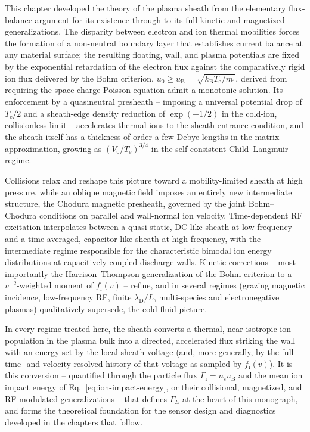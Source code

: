 This chapter developed the theory of the plasma sheath from the elementary flux-balance argument for its existence through to its full kinetic and magnetized generalizations. The disparity between electron and ion thermal mobilities forces the formation of a non-neutral boundary layer that establishes current balance at any material surface; the resulting floating, wall, and plasma potentials are fixed by the exponential retardation of the electron flux against the comparatively rigid ion flux delivered by the Bohm criterion, $u_{0} \ge u_{\mathrm{B}} = \sqrt{k_{\mathrm{B}} T_{\mathrm{e}}/m_{\mathrm{i}}}$, derived from requiring the space-charge Poisson equation admit a monotonic solution. Its enforcement by a quasineutral presheath -- imposing a universal potential drop of $T_{\mathrm{e}}/2$ and a sheath-edge density reduction of $\exp(-1/2)$ in the cold-ion, collisionless limit -- accelerates thermal ions to the sheath entrance condition, and the sheath itself has a thickness of order a few Debye lengths in the matrix approximation, growing as $(V_{0}/T_{\mathrm{e}})^{3/4}$ in the self-consistent Child--Langmuir regime.

Collisions relax and reshape this picture toward a mobility-limited sheath at high pressure, while an oblique magnetic field imposes an entirely new intermediate structure, the Chodura magnetic presheath, governed by the joint Bohm--Chodura conditions on parallel and wall-normal ion velocity. Time-dependent RF excitation interpolates between a quasi-static, DC-like sheath at low frequency and a time-averaged, capacitor-like sheath at high frequency, with the intermediate regime responsible for the characteristic bimodal ion energy distributions at capacitively coupled discharge walls. Kinetic corrections -- most importantly the Harrison--Thompson generalization of the Bohm criterion to a $v^{-2}$-weighted moment of $f_{\mathrm{i}}(v)$ -- refine, and in several regimes (grazing magnetic incidence, low-frequency RF, finite $\lambda_{\mathrm{D}}/L$, multi-species and electronegative plasmas) qualitatively supersede, the cold-fluid picture.

In every regime treated here, the sheath converts a thermal, near-isotropic ion population in the plasma bulk into a directed, accelerated flux striking the wall with an energy set by the local sheath voltage (and, more generally, by the full time- and velocity-resolved history of that voltage as sampled by $f_{\mathrm{i}}(v)$). It is this conversion -- quantified through the particle flux $\Gamma_{\mathrm{i}} = n_{\mathrm{s}} u_{\mathrm{B}}$ and the mean ion impact energy of Eq.~\eqref{eq:ion-impact-energy}, or their collisional, magnetized, and RF-modulated generalizations -- that defines $\Gamma_{E}$ at the heart of this monograph, and forms the theoretical foundation for the sensor design and diagnostics developed in the chapters that follow.
